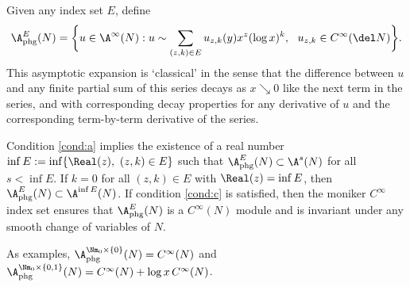 Given any index set $E$, define
\begin{equation*}
\A_{\mathrm{phg}}^E(N) = \biggl\{u \in \A^\infty(N): u \sim \sum_{(z,k) \in E} u_{z,k}(y) x^z (\log x)^k,\ \ u_{z,k} \in C^\infty(\del N) \biggr\}.
\end{equation*}
This asymptotic expansion is `classical' in the sense that the difference between $u$ and any finite partial sum of this series decays as $x \searrow 0$
like the next term in the series, and with corresponding decay properties for any derivative of $u$ and the corresponding term-by-term derivative of the series.

Condition \eqref{cond:a} implies the existence of a real number $\inf E := \inf \{\Real (z),\ (z,k)\in E\}$ such that $\A_{\mathrm{phg}}^E(N)\subset \A^s(N)$
for all $s<\inf E$. If $k=0$ for all $(z,k)\in E$ with $\Real(z) = \inf E$, then $\A_{\mathrm{phg}}^E(N) \subset \A^{\inf E}(N)$.
If condition \eqref{cond:c} is satisfied, then the moniker $C^\infty$ index set ensures that $\A_{\mathrm{phg}}^E(N)$ is a $C^\infty(N)$ module and is
invariant under any smooth change of variables of $N$.

As examples, $\A_{\mathrm{phg}}^{\Nm_0\times \{0\}}(N) = C^\infty(N)$ and $\A_{\mathrm{phg}}^{\Nm_0\times \{0,1\}}(N) = C^\infty(N)+\log x \, C^\infty(N)$.

